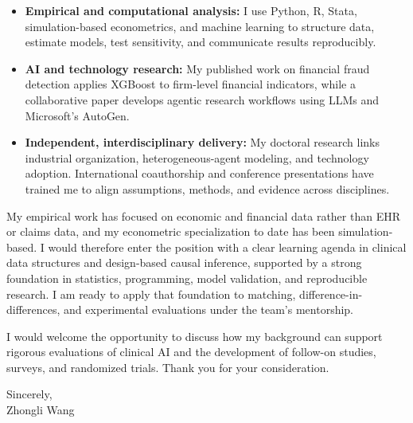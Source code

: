 \documentclass[11pt]{article}
\begin{document}
\begin{itemize}
    \setlength{\itemsep}{0.05em}
    \setlength{\topsep}{0em}
    \item \textbf{Empirical and computational analysis:} I use Python, R, Stata, simulation-based econometrics, and machine learning to structure data, estimate models, test sensitivity, and communicate results reproducibly.
    \item \textbf{AI and technology research:} My published work on financial fraud detection applies XGBoost to firm-level financial indicators, while a collaborative paper develops agentic research workflows using LLMs and Microsoft's AutoGen.
    \item \textbf{Independent, interdisciplinary delivery:} My doctoral research links industrial organization, heterogeneous-agent modeling, and technology adoption. International coauthorship and conference presentations have trained me to align assumptions, methods, and evidence across disciplines.
\end{itemize}

My empirical work has focused on economic and financial data rather than EHR or claims data, and my econometric specialization to date has been simulation-based. I would therefore enter the position with a clear learning agenda in clinical data structures and design-based causal inference, supported by a strong foundation in statistics, programming, model validation, and reproducible research. I am ready to apply that foundation to matching, difference-in-differences, and experimental evaluations under the team's mentorship.

I would welcome the opportunity to discuss how my background can support rigorous evaluations of clinical AI and the development of follow-on studies, surveys, and randomized trials. Thank you for your consideration.

Sincerely,
\\[0.1cm]
Zhongli Wang
\end{document}
